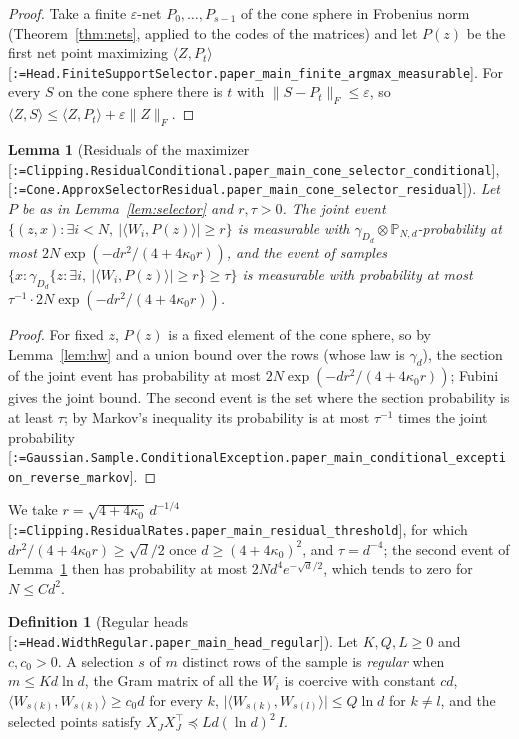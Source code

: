 \documentclass[11pt]{article}
\makeatletter
\newcommand{\formal@break}[1]{\@tfor\formal@tok:=#1\do{%
  \formal@tok
  \expandafter\ifx\formal@tok.\allowbreak\else
  \expandafter\ifx\formal@tok\_\allowbreak\fi\fi}}
\DeclareRobustCommand{\formal}[1]{\textnormal{[\texttt{\small\formal@break{#1}}]}}
\newcommand{\Prob}{\mathbb{P}}
\newcommand{\ip}[2]{\langle #1, #2\rangle}
\newcommand{\norm}[1]{\lVert #1\rVert}
\newcommand{\abs}[1]{\lvert #1\rvert}
\newcommand{\Fro}{F}
\newcommand{\sqd}{\sqrt{d}}
\newcommand{\Id}{I}
\newcommand{\gauss}{\gamma}
\newcommand{\Dd}{D}
\theoremstyle{plain}
\newtheorem{lemma}[theorem]{Lemma}
\theoremstyle{definition}
\newtheorem{definition}[theorem]{Definition}
\makeatother
\begin{document}
\begin{proof}
Take a finite $\varepsilon$-net $P_0, \dots, P_{s-1}$ of the cone sphere in
Frobenius norm (Theorem~\ref{thm:nets}, applied to the codes of the
matrices) and let $P(z)$ be the first net point maximizing
$\ip{Z}{P_t}$ \formal{Head.FiniteSupportSelector.paper\_main\_finite\_argmax\_measurable}.
For every $S$ on the cone sphere there is $t$ with $\norm{S - P_t}_\Fro \le \varepsilon$,
so $\ip{Z}{S} \le \ip{Z}{P_t} + \varepsilon\norm{Z}_\Fro$.
\end{proof}

\begin{lemma}[Residuals of the maximizer \formal{Clipping.ResidualConditional.paper\_main\_cone\_selector\_conditional}, \formal{Cone.ApproxSelectorResidual.paper\_main\_cone\_selector\_residual}]\label{lem:residual}
Let $P$ be as in Lemma~\ref{lem:selector} and $r, \tau > 0$. The joint event
$\{(z, x) : \exists i < N,\ \abs{\ip{W_i}{P(z)}} \ge r\}$ is measurable with
$\gauss_{\Dd_d}\otimes\Prob_{N,d}$-probability at most $2N\exp(-dr^2/(4 + 4\kappa_0r))$,
and the event of samples $\{x : \gauss_{\Dd_d}\{z : \exists i,\ \abs{\ip{W_i}{P(z)}} \ge r\} \ge \tau\}$
is measurable with probability at most $\tau^{-1}\cdot 2N\exp(-dr^2/(4 + 4\kappa_0r))$.
\end{lemma}

\begin{proof}
For fixed $z$, $P(z)$ is a fixed element of the cone sphere, so by
Lemma~\ref{lem:hw} and a union bound over the rows (whose law is $\gauss_d$),
the section of the joint event has probability at most
$2N\exp(-dr^2/(4 + 4\kappa_0r))$; Fubini gives the joint bound. The
second event is the set where the section probability is at least $\tau$;
by Markov's inequality its probability is at most $\tau^{-1}$ times the
joint probability \formal{Gaussian.Sample.ConditionalException.paper\_main\_conditional\_exception\_reverse\_markov}.
\end{proof}

We take $r = \sqrt{4 + 4\kappa_0}\,d^{-1/4}$
\formal{Clipping.ResidualRates.paper\_main\_residual\_threshold}, for which
$dr^2/(4 + 4\kappa_0r) \ge \sqd/2$ once $d \ge (4 + 4\kappa_0)^2$, and
$\tau = d^{-4}$; the second event of Lemma~\ref{lem:residual} then has
probability at most $2Nd^4e^{-\sqd/2}$, which tends to zero for $N \le Cd^2$.

\begin{definition}[Regular heads \formal{Head.WidthRegular.paper\_main\_head\_regular}]
Let $K, Q, L \ge 0$ and $c, c_0 > 0$. A selection $s$ of $m$ distinct rows of the sample is
\emph{regular} when $m \le Kd\ln d$, the Gram matrix of all the $W_i$ is
coercive with constant $cd$, $\ip{W_{s(k)}}{W_{s(k)}} \ge c_0d$ for every $k$,
$\abs{\ip{W_{s(k)}}{W_{s(l)}}} \le Q\ln d$ for $k \ne l$, and the selected points
satisfy $X_JX_J^{\top} \preceq Ld(\ln d)^2\,\Id$.
\end{definition}
\end{document}
